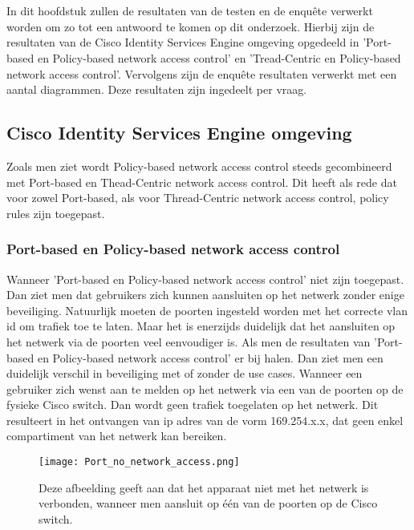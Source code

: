 
 \chapter{}
\label{ch:Resultaten}
In dit hoofdstuk zullen de resultaten van de testen en de enquête verwerkt worden om zo tot een antwoord te komen op dit onderzoek. Hierbij zijn de resultaten van de Cisco Identity Services Engine omgeving opgedeeld in 'Port-based en Policy-based network access control' en 'Tread-Centric en Policy-based network access control'. Vervolgens zijn de enquête resultaten verwerkt met een aantal diagrammen. Deze resultaten zijn ingedeelt per vraag. 

\section{Cisco Identity Services Engine omgeving}
Zoals men ziet wordt Policy-based network access control steeds gecombineerd met Port-based en Thead-Centric network access control. Dit heeft als rede dat voor zowel Port-based, als voor Thread-Centric network access control, policy rules zijn toegepast.


\subsection{Port-based en Policy-based network access control}
Wanneer 'Port-based en Policy-based network access control' niet zijn toegepast. Dan ziet men dat gebruikers zich kunnen aansluiten op het netwerk zonder enige beveiliging. Natuurlijk moeten de poorten ingesteld worden met het correcte vlan id om trafiek toe te laten. Maar het is enerzijds duidelijk dat het aansluiten op het netwerk via de poorten veel eenvoudiger is. 
\newline
\newline
Als men de resultaten van 'Port-based en Policy-based network access control' er bij halen. Dan ziet men een duidelijk verschil in beveiliging  met of zonder de use cases. Wanneer een gebruiker zich wenst aan te melden op het netwerk via een van de poorten op de fysieke Cisco switch. Dan wordt geen trafiek toegelaten op het netwerk. Dit resulteert in het ontvangen van ip adres van de vorm 169.254.x.x, dat geen enkel compartiment van het netwerk kan bereiken.
 
\begin{figure}[H]
	\centering
	\texttt{[image: Port\_no\_network\_access.png]}
	\caption{Deze afbeelding geeft aan dat het apparaat niet met het netwerk is verbonden, wanneer men aansluit op één van de poorten op de Cisco switch.}
\end{figure}

